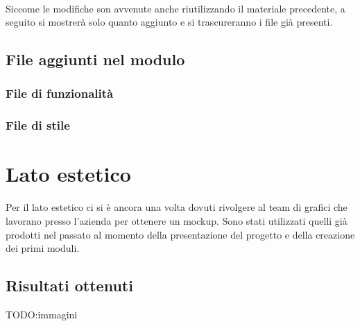 \paragraph{} Siccome le modifiche son avvenute anche riutilizzando il materiale precedente, a seguito si mostrerà solo quanto aggiunto e si trascureranno i file già presenti.
\subsection{File aggiunti nel modulo}
\subsubsection{File di funzionalità}
\subsubsection{File di stile}
\section{Lato estetico}
Per il lato estetico ci si è ancora una volta dovuti rivolgere al team di grafici che lavorano presso l'azienda per ottenere un mockup. Sono stati utilizzati quelli già prodotti nel passato al momento della presentazione del progetto e della creazione dei primi moduli.
\subsection{Risultati ottenuti}
TODO:immagini